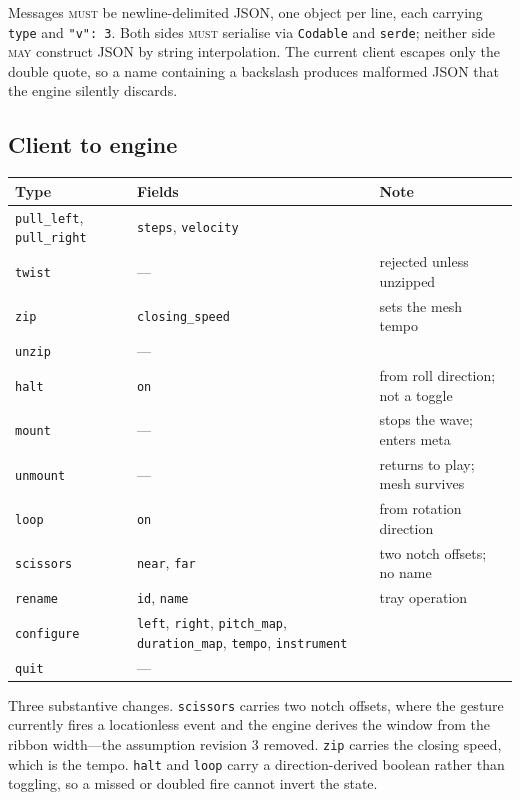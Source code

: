 \documentclass[11pt,a4paper]{article}
\newcommand{\MUST}{\textsc{must}}
\newcommand{\MAY}{\textsc{may}}
\theoremstyle{definition}
\theoremstyle{plain}
\theoremstyle{remark}
\begin{document}
Messages \MUST{} be newline-delimited JSON, one object per line, each carrying \texttt{type} and
\texttt{"v": 3}. Both sides \MUST{} serialise via \texttt{Codable} and \texttt{serde}; neither side
\MAY{} construct JSON by string interpolation. The current client escapes only the double quote, so
a name containing a backslash produces malformed JSON that the engine silently discards.

\subsection{Client to engine}

\begin{center}
\begin{tabular}{l>{\raggedright\arraybackslash}p{4.6cm}l}
\toprule
\textbf{Type} & \textbf{Fields} & \textbf{Note} \\
\midrule
\texttt{pull\_left}, \texttt{pull\_right} & \texttt{steps}, \texttt{velocity} & \\
\texttt{twist}     & --- & rejected unless unzipped \\
\texttt{zip}       & \texttt{closing\_speed} & sets the mesh tempo \\
\texttt{unzip}     & --- & \\
\texttt{halt}      & \texttt{on} & from roll direction; not a toggle \\
\texttt{mount}     & --- & stops the wave; enters meta \\
\texttt{unmount}   & --- & returns to play; mesh survives \\
\texttt{loop}      & \texttt{on} & from rotation direction \\
\texttt{scissors}  & \texttt{near}, \texttt{far} & two notch offsets; no name \\
\texttt{rename}    & \texttt{id}, \texttt{name} & tray operation \\
\texttt{configure} & \texttt{left}, \texttt{right}, \texttt{pitch\_map},
                     \texttt{duration\_map}, \texttt{tempo}, \texttt{instrument} & \\
\texttt{quit}      & --- & \\
\bottomrule
\end{tabular}
\end{center}

Three substantive changes. \texttt{scissors} carries two notch offsets, where the gesture
currently fires a locationless event and the engine derives the window from the ribbon width---the
assumption revision 3 removed. \texttt{zip} carries the closing speed, which is the tempo.
\texttt{halt} and \texttt{loop} carry a direction-derived boolean rather than toggling, so a
missed or doubled fire cannot invert the state.
\end{document}
